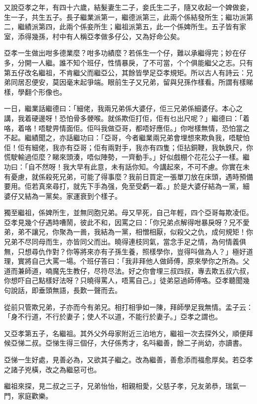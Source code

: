 \documentclass[a5paper, 12pt, openany]{book} %
\begin{document}
	又說亞孝之年，有四十六歲，結髮妻生二子，妾氏生二子，隨又收起一个婢做妾，生一子，共生五子。長子繼業派第一，繼德派第三，此兩个係結發所生；繼功派第二，繼績派第四，此兩个係妾所生；繼祖派第五，此一个係婢所生。五子皆有家室，添得幾孫，村中有人稱亞孝做多仔公，又為好命公矣。

	亞孝一生做出咁多德業麼？咁多功績麼？若係生一个仔，難以承繼得完；妙在仔多，分開一人繼。誰不知个班仔，性情暴戾，了不可當，个个俱能繼父之志。只有第五仔改名繼祖，不肯繼父而繼亞公，其餘皆學足亞孝規矩。所以古人有詩云：兄弟同居忍便安，莫因毫末起爭端。眼前生子又兄弟，留與兒孫作樣看。所謂有樣睇樣，學翻个形像也。

	一日，繼業話繼德曰：「細佬，我兩兄弟係大婆仔，佢三兄弟係細婆仔。本心之講，我着硬邊呀！恐怕骨多骾喉。就係欺佢打佢，佢有乜出尺呢？」繼德曰：「着咯，着咯！唔駛畀情面佢。佢呌我做亞哥，都唔好應佢。」你咁樣無情，恐怕當之不起。繼績聞之，亦話繼功曰：「亞哥，今者繼業兩兄弟會埋想來欺負我，唔駛怕佢！佢有細佬，我亦有亞哥；佢有兩對手，我亦有四隻；佢拈銅鞭，我執鉄尺，你慌駛輸過佢麼？睇來頭湊，唔似陣勢，一齊動手。」好似戲棚个花花公子一樣。繼功曰：「自不然呀！我大早有此意，未有話你知。今講起來，不可不慮。你實在未有憂慮，就係殺死兄弟，可能了得事麼？我前日買定一張單刀放在床頭，遇時預備要用。佢若真來尋打，就先下手為强，免至受虧一着。」於是大婆仔結為一黨，細婆仔又結為一黨矣。家運衰到个樣子。

	獨至繼祖，係婢所生，並無同胞兄弟。母又早死，自己年輕，四个亞哥每欺凌佢。亞孝見幾个仔遇時嘈鬧，彼此不和，因罵之曰：「你兄弟点解得咁暴戾呀？兄不愛弟，弟不讓兄，你聚為一啚，我結為一黨，相憎相厭，似殺父之仇，成何規矩！你兄弟不尽同母而生，亦皆同父而出。曉得連枝同氣，當念手足之情，為何情義俱無，只想尋仇作對？你等將來亦有子孫生養，照樣學你，豈得呌做為人？」極好道理，實將自己大罵一場。个班仔答曰：「我非拜他人做師傅，原來學你之所為。父道而兼師道，喃魔先生教仔，尽符尽法。好之你會埋三叔四叔，專去欺五叔六叔，你想吓自己點樣好法呀？只曉得罵人，唔罵自己。」徒弟惡過師傅咯。亞孝聽聞幾句說話，即垂頭無語，長歎一聲而去。

	從前只管欺兄弟，子亦而今有弟兄。相打相爭如一陳，拜師學足我無情。孟子云：「身不行道，不行於妻子；使人不以道，不能行於妻子。」亞孝之謂也。

	又亞孝第五子，名繼祖。其外父外母家附近三泊地方，繼祖一次去探外父，順便拜候亞悌二叔。亞悌生得三個仔，大仔係秀才，名呌繼善，餘二子尚幼，亦讀書。

	亞悌一生好處，見善必為，又欲其子繼之。改為繼善，善愈添而福愈厚矣。若亞孝之諸子兇橫，改之為繼惡可也。

	繼祖來探，見二叔之三子，兄弟怡怡，相親相愛，父慈子孝，兄友弟恭，瑞氣一門，家庭歡樂。
\end{document}

